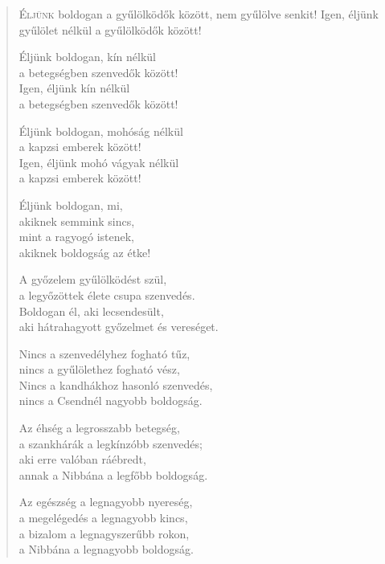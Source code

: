 
\begin{verse}

{\par%
\lettrine{É}{ljünk} {\LettrineTextFont boldogan a gyűlölködők között,}\newline
nem gyűlölve senkit!\newline
Igen, éljünk gyűlölet nélkül\verselinebreak
a gyűlölködők között!
\par}

 Éljünk boldogan, kín nélkül\\
a betegségben szenvedők között!\\
Igen, éljünk kín nélkül\\
a betegségben szenvedők között!

 Éljünk boldogan, mohóság nélkül\\
a kapzsi emberek között!\\
Igen, éljünk mohó vágyak nélkül\\
a kapzsi emberek között!

 Éljünk boldogan, mi,\\
akiknek semmink sincs,\\
mint a ragyogó istenek,\\
akiknek boldogság az étke!

 A győzelem gyűlölködést szül,\\
a legyőzöttek élete csupa szenvedés.\\
Boldogan él, aki lecsendesült,\\
aki hátrahagyott győzelmet és vereséget.

 Nincs a szenvedélyhez fogható tűz,\\
nincs a gyűlölethez fogható vész,\\
Nincs a kandhákhoz hasonló szenvedés,\\
nincs a Csendnél nagyobb boldogság.

 Az éhség a legrosszabb betegség,\\
a szankhárák a legkínzóbb szenvedés;\\
aki erre valóban ráébredt,\\
annak a Nibbána a legfőbb boldogság.

 Az egészség a legnagyobb nyereség,\\
a megelégedés a legnagyobb kincs,\\
a bizalom a legnagyszerűbb rokon,\\
a Nibbána a legnagyobb boldogság.


\end{verse}
